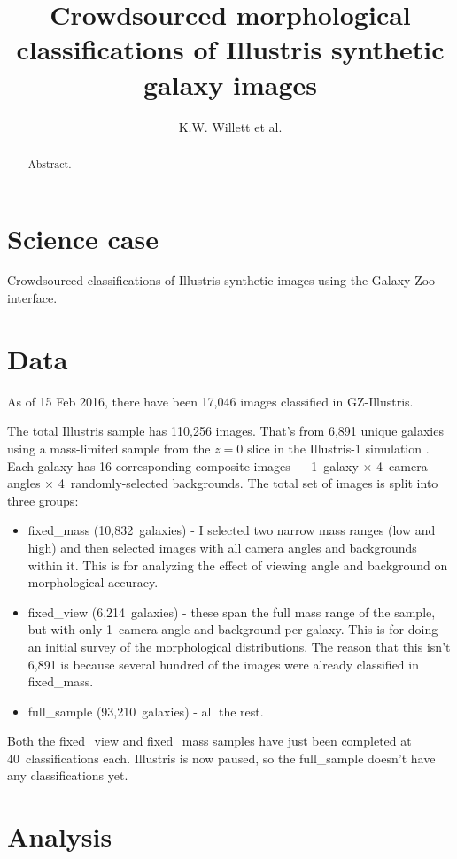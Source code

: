 \documentclass[iop,apj,tighten]{emulateapj}
\begin{document}
\title{Crowdsourced morphological classifications of Illustris synthetic galaxy images}
\author{K.W. Willett et al.}

\begin{abstract}
Abstract.
\end{abstract}

\maketitle

\section{Science case}

Crowdsourced classifications of Illustris synthetic images \citep{sny15,tor15} using the Galaxy Zoo \citep{lin08,wil13} interface. 

\section{Data}

As of 15 Feb 2016, there have been 17,046 images classified in GZ-Illustris. 

The total Illustris sample has 110,256 images. That's from 6,891 unique galaxies using a mass-limited sample from the $z=0$ slice in the Illustris-1 simulation \citep{vog14a}. Each galaxy has 16 corresponding composite images --- 1~galaxy $\times$ 4~camera angles $\times$ 4~randomly-selected backgrounds. The total set of images is split into three groups:

\begin{itemize}

\item fixed\_mass (10,832~galaxies) - I selected two narrow mass ranges (low and high) and then selected images with all camera angles and backgrounds within it. This is for analyzing the effect of viewing angle and background on morphological accuracy.
\item fixed\_view (6,214~galaxies) - these span the full mass range of the sample, but with only 1~camera angle and background per galaxy. This is for doing an initial survey of the morphological distributions. The reason that this isn't 6,891 is because several hundred of the images were already classified in fixed\_mass.
\item full\_sample (93,210~galaxies) - all the rest.

\end{itemize}
Both the fixed\_view and fixed\_mass samples have just been completed at 40~classifications each. Illustris is now paused, so the full\_sample doesn't have any classifications yet. 

\section{Analysis}



\acknowledgments{
}



\end{document}
